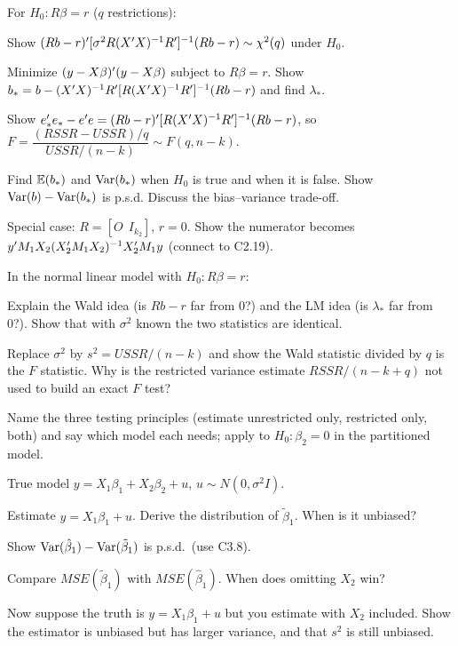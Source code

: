 \documentclass[11pt]{article}
\begin{document}
For $H_{0}: R\beta = r$ ($q$ restrictions):
\begin{flatlist}
  \item[(a)] Show $(Rb - r)^{\prime}[\sigma^{2}R(X^{\prime} X)^{-1}R^{\prime}]^{-1}(Rb - r) \sim \chi^{2}(q)$ under $H_{0}$.
  \item[(b)] Minimize $(y - X\beta)^{\prime}(y - X\beta)$ subject to $R\beta = r$. Show
        $b_{*} = b - (X^{\prime} X)^{-1}R^{\prime}[R(X^{\prime} X)^{-1}R^{\prime}]^{-1}(Rb - r)$ and find $\lambda_{*}$.
  \item[(c)] Show $e_{*}^{\prime} e_{*} - e^{\prime} e = (Rb - r)^{\prime}[R(X^{\prime} X)^{-1}R^{\prime}]^{-1}(Rb - r)$,
        so $F = \dfrac{(RSSR - USSR)/q}{USSR/(n-k)} \sim F(q, n-k)$.
  \item[(d)] Find $\mathbb{E}(b_{*})$ and $\operatorname{Var}(b_{*})$ when $H_{0}$ is true and when it is false.
        Show $\operatorname{Var}(b) - \operatorname{Var}(b_{*})$ is p.s.d. Discuss the bias--variance trade-off.
  \item[(e)] Special case: $R = [O\ \ I_{k_{2}}]$, $r = 0$. Show the numerator becomes
        $y^{\prime} M_{1}X_{2}(X_{2}^{\prime} M_{1}X_{2})^{-1}X_{2}^{\prime} M_{1}y$ (connect to C2.19).
\end{flatlist}

In the normal linear model with $H_{0}: R\beta = r$:
\begin{flatlist}
  \item[(a)] Explain the Wald idea (is $Rb - r$ far from 0?) and the LM idea (is $\lambda_{*}$ far
        from 0?). Show that with $\sigma^{2}$ known the two statistics are identical.
  \item[(b)] Replace $\sigma^{2}$ by $s^{2} = USSR/(n-k)$ and show the Wald statistic
        divided by $q$ is the $F$ statistic. Why is the restricted variance estimate
        $RSSR/(n-k+q)$ not used to build an exact $F$ test?
  \item[(c)] Name the three testing principles (estimate unrestricted only, restricted
        only, both) and say which model each needs; apply to $H_{0}: \beta_{2} = 0$ in the
        partitioned model.
\end{flatlist}

True model $y = X_{1}\beta_{1} + X_{2}\beta_{2} + u$, $u \sim N(0,\sigma^{2}I)$.
\begin{flatlist}
  \item[(a)] Estimate $y = X_{1}\beta_{1} + u$. Derive the distribution of $\tilde\beta_{1}$.
        When is it unbiased?
  \item[(b)] Show $\operatorname{Var}(\hat\beta_{1}) - \operatorname{Var}(\tilde\beta_{1})$ is p.s.d.\ (use C3.8).
  \item[(c)] Compare $MSE(\tilde\beta_{1})$ with $MSE(\hat\beta_{1})$. When does omitting $X_{2}$ win?
  \item[(d)] Now suppose the truth is $y = X_{1}\beta_{1} + u$ but you estimate with $X_{2}$
        included. Show the estimator is unbiased but has larger variance, and that
        $s^{2}$ is still unbiased.
\end{flatlist}
\end{document}

